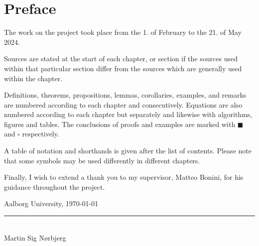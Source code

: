 \chapter*{Preface}


The work on the project took place from the 1. of February to the 21. of May 2024.

Sources are stated at the start of each chapter, or section if the sources used within that particular section differ from the sources which are generally used within the chapter.

Definitions, theorems, propositions, lemmas, corollaries, examples, and remarks are numbered according to each chapter and consecutively.
Equations are also numbered according to each chapter but separately and likewise with algorithms, figures and tables.
The conclusions of proofs and examples are marked with $\blacksquare$ and $\square$ respectively.

A table of notation and shorthands is given after the list of contents.
Please note that some symbols may be used differently in different chapters.

Finally, I wish to extend a thank you to my supervisor, Matteo Bonini, for his guidance throughout the project.

\vspace{\baselineskip}\hfill Aalborg University, \today
\vfill\noindent

\begin{minipage}[H]{\textwidth}
	\centering
	\rule{\textwidth / 2}{1pt}\\
	Martin Sig Nørbjerg\\
	{\footnotesize {}}
\end{minipage}
\hfill
